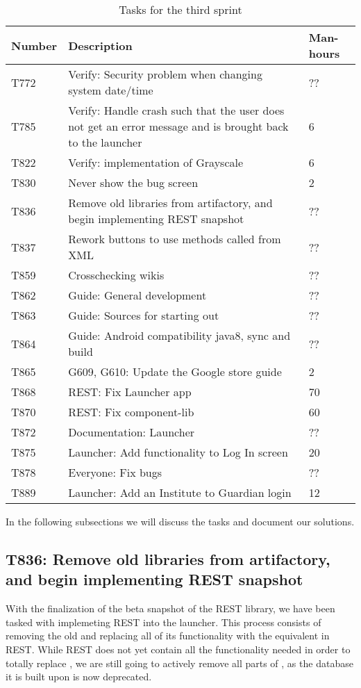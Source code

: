 \begin{table}[H]
\begin{centering}
\begin{tabular}{|l|p{9cm}|l|}
\hline
Number 	& Description & Man-hours \\ \hline
T772    & Verify: Security problem when changing system date/time & ??\\\hline
T785	& Verify: Handle crash such that the user does not get an error message and
is brought back to the launcher & 6\\ \hline
T822    & Verify: implementation of Grayscale & 6\\\hline
T830    & Never show the bug screen & 2 \\\hline
T836	& Remove old libraries from artifactory, and begin implementing REST
snapshot & ??\\\hline
T837	& Rework buttons to use methods called from XML & ??\\\hline
T859   	& Crosschecking wikis & ??\\\hline
T862  	& Guide: General development & ?? \\ \hline
T863	& Guide: Sources for starting out & ??\\ \hline
T864	& Guide: Android compatibility java8, sync and build & ??\\
\hline 
T865	& G609, G610: Update the Google store guide & 2\\\hline
T868    & REST: Fix Launcher app & 70 \\\hline
T870    & REST: Fix component-lib & 60\\\hline
T872 	& Documentation: Launcher & ??\\ \hline
T875 	& Launcher: Add functionality to Log In screen & 20\\\hline 
T878 	& Everyone: Fix bugs & ??\\ \hline
T889	& Launcher: Add an Institute to Guardian login & 12 \\\hline
\end{tabular}
\caption{Tasks for the third sprint}
\label{Tasks3}
\end{centering}
\end{table}

In the following subsections we will discuss the tasks and document our
solutions.

\subsection{T836: Remove old libraries from artifactory, and begin implementing REST
snapshot}
With the finalization of the beta snapshot of the REST library, we have been
tasked with implemeting REST into the launcher. This process consists of
removing the old  and replacing all of its functionality with the
equivalent in REST. While REST does not yet contain all the functionality needed
in order to totally replace , we are still going to actively
remove all parts of , as the database it is built upon is
now deprecated.\nl

